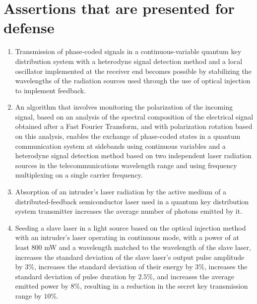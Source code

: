 \section*{Assertions that are presented for defense}
\begin{enumerate}
    \item Transmission of phase-coded signals in a continuous-variable quantum key distribution system with a heterodyne signal detection method and a local oscillator implemented at the receiver end becomes possible by stabilizing the wavelengths of the radiation sources used through the use of optical injection to implement feedback.
    \item An algorithm that involves monitoring the polarization of the incoming signal, based on an analysis of the spectral composition of the electrical signal obtained after a Fast Fourier Transform, and with polarization rotation based on this analysis, enables the exchange of phase-coded states in a quantum communication system at sidebands using continuous variables and a heterodyne signal detection method based on two independent laser radiation sources in the telecommunications wavelength range and using frequency multiplexing on a single carrier frequency.
    \item Absorption of an intruder's laser radiation by the active medium of a distributed-feedback semiconductor laser used in a quantum key distribution system transmitter increases the average number of photons emitted by it.
    \item Seeding a slave laser in a light source based on the optical injection method with an intruder's laser operating in continuous mode, with a power of at least 800 mW and a wavelength matched to the wavelength of the slave laser, increases the standard deviation of the slave laser's output pulse amplitude by $3\%$, increases the standard deviation of their energy by $3\%$, increases the standard deviation of pulse duration by $2.5\%$, and increases the average emitted power by $8\%$, resulting in a reduction in the secret key transmission range by $10\%$.
\end{enumerate}

